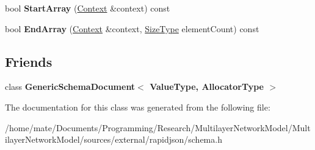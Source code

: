 \begin{DoxyCompactItemize}
\item 
bool {\bfseries Start\+Array} (\hyperlink{structinternal_1_1SchemaValidationContext}{Context} \&context) const \hypertarget{classinternal_1_1Schema_a6340166b92577ce0ef9b7735f66937ec}{}\label{classinternal_1_1Schema_a6340166b92577ce0ef9b7735f66937ec}

\item 
bool {\bfseries End\+Array} (\hyperlink{structinternal_1_1SchemaValidationContext}{Context} \&context, \hyperlink{rapidjson_8h_a5ed6e6e67250fadbd041127e6386dcb5}{Size\+Type} element\+Count) const \hypertarget{classinternal_1_1Schema_a58101f966bd7e51086d456b3d84653eb}{}\label{classinternal_1_1Schema_a58101f966bd7e51086d456b3d84653eb}

\end{DoxyCompactItemize}
\subsection*{Friends}
\begin{DoxyCompactItemize}
\item 
class {\bfseries Generic\+Schema\+Document$<$ Value\+Type, Allocator\+Type $>$}\hypertarget{classinternal_1_1Schema_a04f1d1acd0a5a7fda069c115970d52b3}{}\label{classinternal_1_1Schema_a04f1d1acd0a5a7fda069c115970d52b3}

\end{DoxyCompactItemize}


The documentation for this class was generated from the following file\+:\begin{DoxyCompactItemize}
\item 
/home/mate/\+Documents/\+Programming/\+Research/\+Multilayer\+Network\+Model/\+Multilayer\+Network\+Model/sources/external/rapidjson/schema.\+h\end{DoxyCompactItemize}
